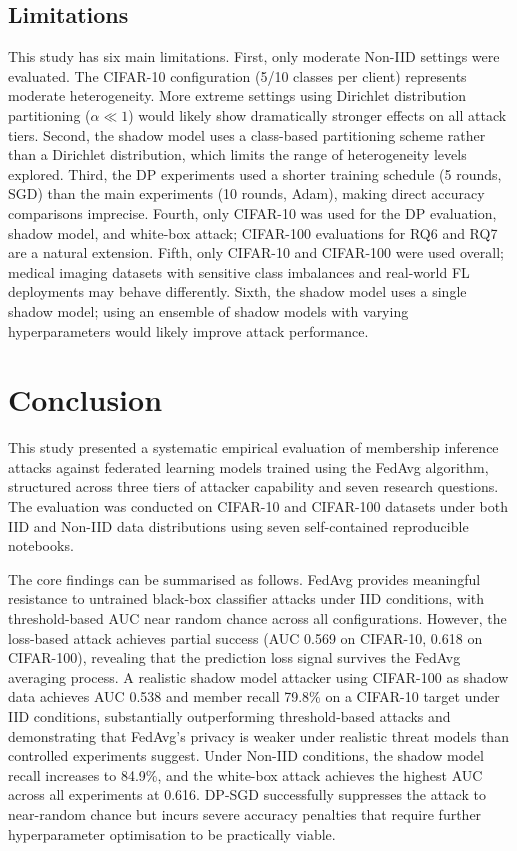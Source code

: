 \documentclass[12pt, a4paper]{report}
\begin{document}
\section{Limitations}

This study has six main limitations. First, only moderate Non-IID settings were
evaluated. The CIFAR-10 configuration (5/10 classes per client) represents
moderate heterogeneity. More extreme settings using Dirichlet distribution
partitioning ($\alpha \ll 1$) would likely show dramatically stronger effects
on all attack tiers. Second, the shadow model uses a class-based partitioning
scheme rather than a Dirichlet distribution, which limits the range of
heterogeneity levels explored. Third, the DP experiments used a shorter training
schedule (5 rounds, SGD) than the main experiments (10 rounds, Adam), making
direct accuracy comparisons imprecise. Fourth, only CIFAR-10 was used for the
DP evaluation, shadow model, and white-box attack; CIFAR-100 evaluations for
RQ6 and RQ7 are a natural extension. Fifth, only CIFAR-10 and CIFAR-100 were
used overall; medical imaging datasets with sensitive class imbalances and
real-world FL deployments may behave differently. Sixth, the shadow model uses
a single shadow model; using an ensemble of shadow models with varying
hyperparameters would likely improve attack performance.

\chapter{Conclusion}

This study presented a systematic empirical evaluation of membership inference
attacks against federated learning models trained using the FedAvg algorithm,
structured across three tiers of attacker capability and seven research questions.
The evaluation was conducted on CIFAR-10 and CIFAR-100 datasets under both IID
and Non-IID data distributions using seven self-contained reproducible notebooks.

The core findings can be summarised as follows. FedAvg provides meaningful
resistance to untrained black-box classifier attacks under IID conditions, with
threshold-based AUC near random chance across all configurations. However,
the loss-based attack achieves partial success (AUC 0.569 on CIFAR-10, 0.618
on CIFAR-100), revealing that the prediction loss signal survives the FedAvg
averaging process. A realistic shadow model attacker using CIFAR-100 as shadow
data achieves AUC 0.538 and member recall 79.8\% on a CIFAR-10 target under
IID conditions, substantially outperforming threshold-based attacks
and demonstrating that FedAvg's privacy is weaker under realistic threat models
than controlled experiments suggest. Under Non-IID conditions, the shadow model
recall increases to 84.9\%, and the white-box attack achieves the highest AUC
across all experiments at 0.616. DP-SGD successfully suppresses the attack to
near-random chance but incurs severe accuracy penalties that require further
hyperparameter optimisation to be practically viable.
\end{document}
